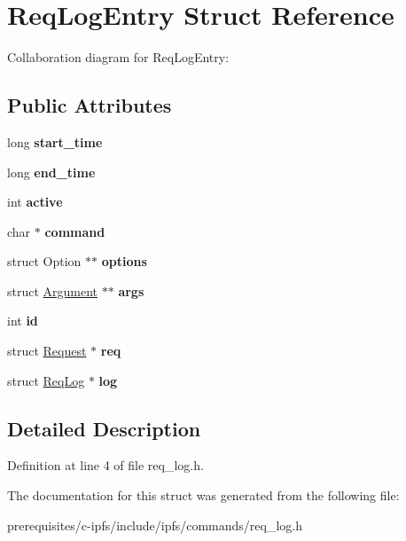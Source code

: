 \hypertarget{struct_req_log_entry}{}\section{Req\+Log\+Entry Struct Reference}
\label{struct_req_log_entry}


Collaboration diagram for Req\+Log\+Entry\+:
\subsection*{Public Attributes}
\begin{DoxyCompactItemize}
\item 
\mbox{\label{struct_req_log_entry_a8779b6790a88453014584e4cfe53d8d6}} 
long {\bfseries start\+\_\+time}
\item 
\mbox{\label{struct_req_log_entry_ab8edd7a61d0c4c08b15eb582b0b44270}} 
long {\bfseries end\+\_\+time}
\item 
\mbox{\label{struct_req_log_entry_a85c5441bbff1f7e8713d44bf6b02e6ad}} 
int {\bfseries active}
\item 
\mbox{\label{struct_req_log_entry_a0504d572f0b5fa2998939c8a969772c6}} 
char $\ast$ {\bfseries command}
\item 
\mbox{\label{struct_req_log_entry_ac0f0cc5c2d3918deabd8fa6dc5859400}} 
struct Option $\ast$$\ast$ {\bfseries options}
\item 
\mbox{\label{struct_req_log_entry_a9f19fd1d0f937d47930de88d8a1b25c7}} 
struct \mbox{\hyperlink{struct_argument}{Argument}} $\ast$$\ast$ {\bfseries args}
\item 
\mbox{\label{struct_req_log_entry_a5c3a0728346303099e8be7c1e67124ee}} 
int {\bfseries id}
\item 
\mbox{\label{struct_req_log_entry_a3938e31514cc59d667c83572197c4e3e}} 
struct \mbox{\hyperlink{struct_request}{Request}} $\ast$ {\bfseries req}
\item 
\mbox{\label{struct_req_log_entry_aadbaa4359da7fb9dd80d0906c86115ee}} 
struct \mbox{\hyperlink{struct_req_log}{Req\+Log}} $\ast$ {\bfseries log}
\end{DoxyCompactItemize}


\subsection{Detailed Description}


Definition at line 4 of file req\+\_\+log.\+h.



The documentation for this struct was generated from the following file\+:\begin{DoxyCompactItemize}
\item 
prerequisites/c-\/ipfs/include/ipfs/commands/req\+\_\+log.\+h\end{DoxyCompactItemize}
